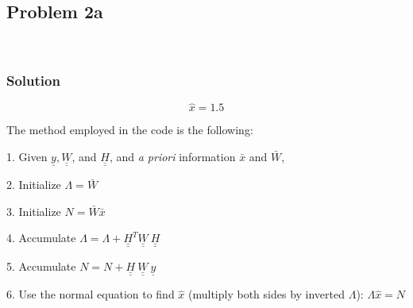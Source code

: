 \documentclass[conf]{new-aiaa}
\begin{document}




\subsection*{Problem 2a} 

\begin{center}
	 \\
\end{center}


\subsubsection*{Solution} 

\begin{equation}
	\hat{x} = 1.5
\end{equation}

The method employed in the code is the following: 

1. Given $\underline{y}, \underline{\underline{W}}$, and $\underline{\underline{H}}$, and \emph{a priori} information $\bar{x}$ and $\bar{W}$, 

2. Initialize $\Lambda = \bar{W}$

3. Initialize $N = \bar{W} \bar{x}$

4. Accumulate $\Lambda = \Lambda + \underline{\underline{H}}^T \underline{\underline{W}} ~ \underline{\underline{H}}$

5. Accumulate $ N = N + \underline{\underline{H}} ~ \underline{\underline{W}} ~\underline{y} $

6. Use the normal equation to find $\hat{x}$ (multiply both sides by inverted $\Lambda$): $\Lambda \hat{x} = N$
\end{document}
